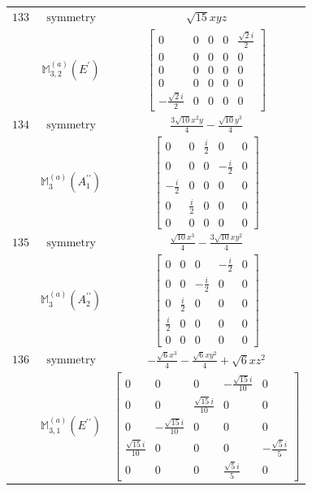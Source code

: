 \documentclass[fleqn,8pt,landscape]{jsarticle}
\begin{document}
\begin{longtable}{ccc}
$ 133 $ & $ \text{symmetry} $ & $ \sqrt{15} x y z $ \\
$  $ & $ \mathbb{M}_{3,2}^{(a)}(E^{\prime}) $ & $ \begin{bmatrix} 0 & 0 & 0 & 0 & \frac{\sqrt{2} i}{2} \\ 0 & 0 & 0 & 0 & 0 \\ 0 & 0 & 0 & 0 & 0 \\ 0 & 0 & 0 & 0 & 0 \\ - \frac{\sqrt{2} i}{2} & 0 & 0 & 0 & 0 \end{bmatrix} $ \\ \hline
$ 134 $ & $ \text{symmetry} $ & $ \frac{3 \sqrt{10} x^{2} y}{4} - \frac{\sqrt{10} y^{3}}{4} $ \\
$  $ & $ \mathbb{M}_{3}^{(a)}(A_{1}^{\prime\prime}) $ & $ \begin{bmatrix} 0 & 0 & \frac{i}{2} & 0 & 0 \\ 0 & 0 & 0 & - \frac{i}{2} & 0 \\ - \frac{i}{2} & 0 & 0 & 0 & 0 \\ 0 & \frac{i}{2} & 0 & 0 & 0 \\ 0 & 0 & 0 & 0 & 0 \end{bmatrix} $ \\ \hline
$ 135 $ & $ \text{symmetry} $ & $ \frac{\sqrt{10} x^{3}}{4} - \frac{3 \sqrt{10} x y^{2}}{4} $ \\
$  $ & $ \mathbb{M}_{3}^{(a)}(A_{2}^{\prime\prime}) $ & $ \begin{bmatrix} 0 & 0 & 0 & - \frac{i}{2} & 0 \\ 0 & 0 & - \frac{i}{2} & 0 & 0 \\ 0 & \frac{i}{2} & 0 & 0 & 0 \\ \frac{i}{2} & 0 & 0 & 0 & 0 \\ 0 & 0 & 0 & 0 & 0 \end{bmatrix} $ \\ \hline
$ 136 $ & $ \text{symmetry} $ & $ - \frac{\sqrt{6} x^{3}}{4} - \frac{\sqrt{6} x y^{2}}{4} + \sqrt{6} x z^{2} $ \\
$  $ & $ \mathbb{M}_{3,1}^{(a)}(E^{\prime\prime}) $ & $ \begin{bmatrix} 0 & 0 & 0 & - \frac{\sqrt{15} i}{10} & 0 \\ 0 & 0 & \frac{\sqrt{15} i}{10} & 0 & 0 \\ 0 & - \frac{\sqrt{15} i}{10} & 0 & 0 & 0 \\ \frac{\sqrt{15} i}{10} & 0 & 0 & 0 & - \frac{\sqrt{5} i}{5} \\ 0 & 0 & 0 & \frac{\sqrt{5} i}{5} & 0 \end{bmatrix} $ \\ \hline

\end{longtable}
\end{document}
